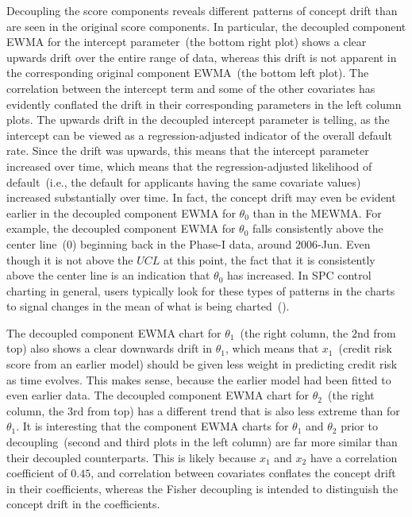 \documentclass[twoside,11pt]{article}
\begin{document}

Decoupling the score components reveals different patterns of concept drift than are seen in the original score components. In particular, the decoupled component EWMA for the intercept parameter~(the bottom right plot) shows a clear upwards drift over the entire range of data, whereas this drift is not apparent in the corresponding original component EWMA~(the bottom left plot). The correlation between the intercept term and some of the other covariates has evidently conflated the drift in their corresponding parameters in the left column plots. The upwards drift in the decoupled intercept parameter is telling, as the intercept can be viewed as a regression-adjusted indicator of the overall default rate. Since the drift was upwards, this means that the intercept parameter increased over time, which means that the regression-adjusted likelihood of default~(i.e., the default for applicants having the same covariate values) increased substantially over time. In fact, the concept drift may even be evident earlier in the decoupled component EWMA for $\theta_0$ than in the MEWMA. For example, the decoupled component EWMA for $\theta_0$ falls consistently above the center line~($0$) beginning back in the Phase-I data, around $2006$-Jun. Even though it is not above the $UCL$ at this point, the fact that it is consistently above the center line is an indication that $\theta_0$ has increased. In SPC control charting in general, users typically look for these types of patterns in the charts to signal changes in the mean of what is being charted~(\cite{montgomery2007introduction}). 

The decoupled component EWMA chart for $\theta_1$~(the right column, the $2$nd from top) also shows a clear downwards drift in $\theta_1$, which means that $x_1$~(credit risk score from an earlier model) should be given less weight in predicting credit risk as time evolves. This makes sense, because the earlier model had been fitted to even earlier data.  The decoupled component EWMA chart for $\theta_2$~(the right column, the $3$rd from top) has a different trend that is also less extreme than for $\theta_1$. It is interesting that the component EWMA charts for $\theta_1$ and $\theta_2$ prior to decoupling~(second and third plots in the left column) are far more similar than their decoupled counterparts. This is likely because $x_1$ and $x_2$ have a correlation coefficient of $0.45$, and correlation between covariates conflates the concept drift in their coefficients, whereas the Fisher decoupling is intended to distinguish the concept drift in the coefficients.    
\end{document}
